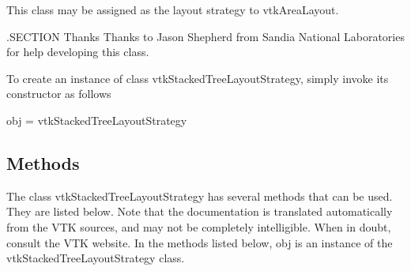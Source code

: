 This class may be assigned as the layout strategy to vtk\-Area\-Layout.

.S\-E\-C\-T\-I\-O\-N Thanks Thanks to Jason Shepherd from Sandia National Laboratories for help developing this class.

To create an instance of class vtk\-Stacked\-Tree\-Layout\-Strategy, simply invoke its constructor as follows \begin{DoxyVerb}  obj = vtkStackedTreeLayoutStrategy
\end{DoxyVerb}
 \hypertarget{vtkwidgets_vtkxyplotwidget_Methods}{}\subsection{Methods}\label{vtkwidgets_vtkxyplotwidget_Methods}
The class vtk\-Stacked\-Tree\-Layout\-Strategy has several methods that can be used. They are listed below. Note that the documentation is translated automatically from the V\-T\-K sources, and may not be completely intelligible. When in doubt, consult the V\-T\-K website. In the methods listed below, {\ttfamily obj} is an instance of the vtk\-Stacked\-Tree\-Layout\-Strategy class. 
